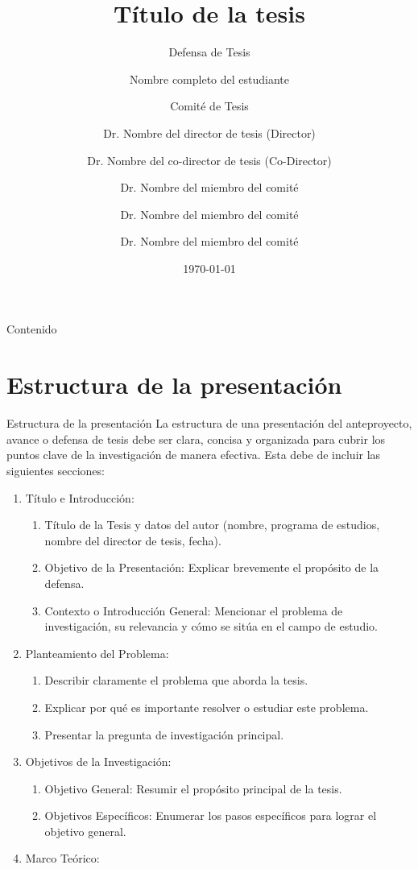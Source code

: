 \documentclass[9pt]{beamer}
\title{Título de la tesis}
\subtitle{Defensa de Tesis}
\institute{Doctorado en Ingeniería para la Innovación Tecnológica}
\author{Nombre completo del estudiante \and 
    Comité de Tesis \and
    Dr. Nombre del director de tesis (Director)\and
    Dr. Nombre del co-director de tesis (Co-Director)\and
    Dr. Nombre del miembro del comité \and
    Dr. Nombre del miembro del comité \and
    Dr. Nombre del miembro del comité}
\date{\today}
\begin{document}
\justifying
\titlepage
\begin{frame}[allowframebreaks]{Contenido}
 \tableofcontents
\end{frame}

\section{Estructura de la presentación}
\begin{frame}{Estructura de la presentación}
La estructura de una presentación del anteproyecto, avance o defensa de tesis debe ser clara, concisa y organizada para cubrir los puntos clave de la investigación de manera efectiva. Esta debe de incluir las siguientes secciones:

\begin{enumerate}
    \item Título e Introducción:
    \begin{enumerate}
        \item Título de la Tesis y datos del autor (nombre, programa de estudios, nombre del director de tesis, fecha).
        \item Objetivo de la Presentación: Explicar brevemente el propósito de la defensa.
        \item Contexto o Introducción General: Mencionar el problema de investigación, su relevancia y cómo se sitúa en el campo de estudio.
    \end{enumerate}
    \item Planteamiento del Problema:
    \begin{enumerate}
        \item Describir claramente el problema que aborda la tesis.
        \item Explicar por qué es importante resolver o estudiar este problema.
        \item Presentar la pregunta de investigación principal.
    \end{enumerate}
    \item Objetivos de la Investigación:
    \begin{enumerate}
        \item Objetivo General: Resumir el propósito principal de la tesis.
        \item Objetivos Específicos: Enumerar los pasos específicos para lograr el objetivo general.
    \end{enumerate}
    \item Marco Teórico:

\end{enumerate}
\end{frame}
\end{document}
